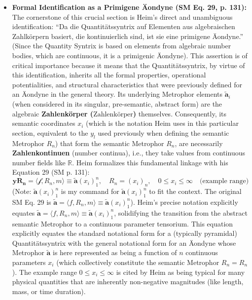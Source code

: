 \documentclass[12pt]{article}
\newcommand{\q}[1]{\enquote{#1}}
\newcommand{\metrophor}{\bm{\widetilde{a}}}
\newcommand{\synkolationsstufe}{m}
\newcommand{\quantitaetssyntrix}{\bm{yR_n}}
\newcommand{\zahlenkoerper}{\text{Zahlenkörper}}
\newcommand{\semantischermetrophor}{R_n}
\newcommand{\funktionaloperator}{\mathcal{f}}
\newcommand{\aeondynechaptereight}{\mathbf{\widetilde{a}}(x_i)^n_1}
\begin{document}
\begin{itemize}
    \item \textbf{Formal Identification as a Primigene Äondyne (SM Eq. 29, p. 131):}
    The cornerstone of this crucial section is Heim's direct and unambiguous identification: \q{Da die Quantitätssyntrix auf Elementen aus algebraischen Zahlkörpern basiert, die kontinuierlich sind, ist sie eine primigene Äondyne.} (Since the Quantity Syntrix is based on elements from algebraic number bodies, which are continuous, it is a primigenic Äondyne). This assertion is of critical importance because it means that the Quantitätssyntrix, by virtue of this identification, inherits all the formal properties, operational potentialities, and structural characteristics that were previously defined for an Äondyne in the general theory. Its underlying Metrophor elements \( \metrophor_i \) (when considered in its singular, pre-semantic, abstract form) are the algebraic \textbf{Zahlenkörper (\(\zahlenkoerper\))} themselves. Consequently, its semantic coordinates \( x_i \) (which is the notation Heim uses in this particular section, equivalent to the \( y_l \) used previously when defining the semantic Metrophor \( \semantischermetrophor \)) that form the semantic Metrophor \( \semantischermetrophor \), are necessarily \textbf{Zahlenkontinuen} (number continua), i.e., they take values from continuous number fields like \( \mathbb{R} \).
    Heim formalizes this fundamental linkage with his Equation 29 (SM p. 131):
    \begin{equation}
    \quantitaetssyntrix = \langle \funktionaloperator, \semantischermetrophor, \synkolationsstufe \rangle \equiv \aeondynechaptereight, \quad \semantischermetrophor = (x_i)_n, \quad 0 \leq x_i \leq \infty \quad \text{(example range)}
    \label{eq:original_quantitaetssyntrix_as_aeondyne}
    \tag{29}
    \end{equation}
    (Note: \( \aeondynechaptereight \) is my command for \( \mathbf{\widetilde{a}}(x_i)^n_1 \) to fit the context. The original SM Eq. 29 is \( \mathbf{\widetilde{a}} = \langle f, R_n, m \rangle \equiv \mathbf{\widetilde{a}} (x_i)^n_1 \)). Heim's precise notation explicitly equates $\mathbf{\widetilde{a}} = \langle f, R_n, m \rangle \equiv \mathbf{\widetilde{a}}(x_i)_1^n$, solidifying the transition from the abstract semantic Metrophor to a continuous parameter tensorium. This equation explicitly equates the standard notational form for a (typically pyramidal) Quantitätssyntrix with the general notational form for an Äondyne whose Metrophor \( \mathbf{\widetilde{a}} \) is here represented as being a function of \( n \) continuous parameters \( x_i \) (which collectively constitute the semantic Metrophor \( \semantischermetrophor = R_n \)). The example range \( 0 \leq x_i \leq \infty \) is cited by Heim as being typical for many physical quantities that are inherently non-negative magnitudes (like length, mass, or time duration).


\end{itemize}
\end{document}
